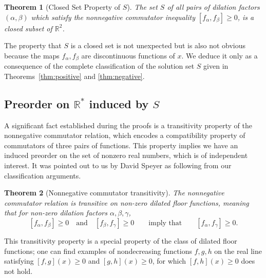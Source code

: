 \documentclass[11pt, letterpaper, reqno]{amsart}
\newtheorem{thm}{Theorem}[section]
\theoremstyle{definition}
\numberwithin{equation}{section}
\newcommand{\RR}{\ensuremath{\mathbb{R}}}
\newcommand{\floor}[1]{\lfloor{#1}\rfloor}
\begin{document}
\begin{thm}[Closed Set Property of $S$]
\label{thm:closed}
The set $S$ of all pairs of dilation factors $(\alpha, \beta)$ which satisfy the nonnegative commutator inequality ${[f_\alpha, f_\beta]\geq 0 }$,
is a closed subset of $\RR^2$.
\end{thm}

\noindent  The property that $S$ is a closed set is not unexpected but is also not obvious because the maps $f_{\alpha}, f_{\beta}$ are discontinuous functions of $x$. 
We deduce it only  as a consequence of  the complete classification of the solution set $S$ given in 
Theorems~\ref{thm:positive} and \ref{thm:negative}.


%
%

\subsection{Preorder on $\RR^*$ induced by $S$}

A  significant  fact  established during the proofs is a transitivity property
of the nonnegative commutator relation, 
which  encodes  a compatibility property of commutators of three pairs of functions.
This property implies we have an induced preorder on the set of nonzero real numbers,
which is of independent interest.  
It was pointed out to us  by David Speyer as following from  our classification arguments. 

%
%
\begin{thm}[Nonnegative commutator transitivity]
\label{thm:poset} 
The  nonnegative commutator relation is transitive on non-zero dilated floor functions, meaning that for non-zero dilation factors $\alpha, \beta, \gamma$, 
\begin{equation}\label{eq:preorder1}
[f_\alpha, f_\beta] \geq 0 \quad\text{and}\quad [f_\beta, f_\gamma] \geq 0 
\qquad\text{imply that}\qquad [f_\alpha, f_\gamma] \geq 0 .
\end{equation}
\end{thm}

This transitivity property  is a special property of the class of dilated floor functions; 
one can  find examples of nondecreasing functions
$f, g, h$ on the real line satisfying  $[f, g](x)  \ge 0$ and $[g, h](x) \ge 0$, 
for which  $[f, h](x) \ge 0$ does not hold.
\end{document}
